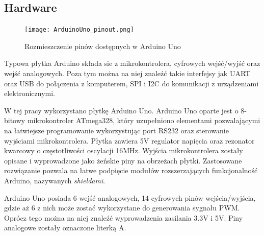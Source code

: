 \subsection{Hardware}%
\begin{figure}[H]
	\centering
	\texttt{[image: ArduinoUno\_pinout.png]}
	\caption{Rozmieszczenie pinów dostępnych w Arduino Uno}
\end{figure}
Typowa płytka Arduino składa sie z mikrokontrolera, cyfrowych wejść/wyjść oraz wejść analogowych. Poza tym można na niej znaleźć takie interfejsy jak UART oraz USB do połączenia z komputerem, SPI i I2C do komunikacji z urządzeniami elektronicznymi.

W tej pracy wykorzystano płytkę Arduino Uno. Arduino Uno oparte jest o 8-bitowy mikrokontroler ATmega328, który uzupełniono elementami pozwalającymi na łatwiejsze programowanie wykorzystując port RS232 oraz sterowanie wyjściami mikrokontrolera. Płytka zawiera 5V regulator napięcia oraz rezonator kwarcowy o częstotliwości oscylacji 16MHz. Wyjścia mikrokontrolera zostały opisane i wyprowadzone jako żeńskie piny na obrzeżach płytki. Zastosowane rozwiązanie pozwala na łatwe podpięcie modułów rozszerzających funkcjonalność Arduino, nazywanych \textit{shieldami}. 

Arduino Uno posiada 6 wejść analogowych, 14 cyfrowych pinów wejścia/wyjścia, gdzie aż 6 z nich może zostać wykorzystane do generowania sygnału PWM. Oprócz tego można na niej znaleźć wyprowadzenia zasilania 3.3V i 5V. Piny analogowe zostały oznaczone literką A.
\newpage
